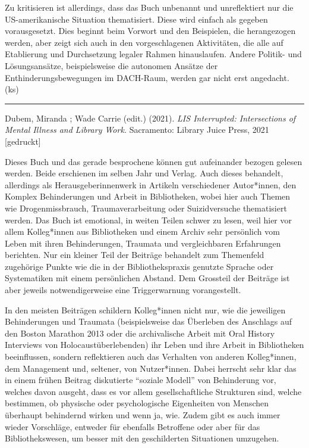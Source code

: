 \documentclass[a4paper,
fontsize=11pt,
oneside,
numbers=noperiodatend,
parskip=half-,
bibliography=totoc,
final
]{scrartcl}
\begin{document}
Zu kritisieren ist allerdings, dass das Buch unbenannt und unreflektiert
nur die US-amerikanische Situation thematisiert. Diese wird einfach als
gegeben vorausgesetzt. Dies beginnt beim Vorwort und den Beispielen, die
herangezogen werden, aber zeigt sich auch in den vorgeschlagenen
Aktivitäten, die alle auf Etablierung und Durchsetzung legaler Rahmen
hinauslaufen. Andere Politik- und Lösungsansätze, beispielsweise die
autonomen Ansätze der Enthinderungsbewegungen im DACH-Raum, werden gar
nicht erst angedacht. (ks)

\begin{center}\rule{0.5\linewidth}{0.5pt}\end{center}

Dubem, Miranda ; Wade Carrie (edit.) (2021). \emph{LIS Interrupted:
Intersections of Mental Illness and Library Work.} Sacramento: Library
Juice Press, 2021 {[}gedruckt{]}

Dieses Buch und das gerade besprochene können gut aufeinander bezogen
gelesen werden. Beide erschienen im selben Jahr und Verlag. Auch dieses
behandelt, allerdings als Herausgeberinnenwerk in Artikeln verschiedener
Autor*innen, den Komplex Behinderungen und Arbeit in Bibliotheken, wobei
hier auch Themen wie Drogenmissbrauch, Traumaverarbeitung oder
Suizidversuche thematisiert werden. Das Buch ist emotional, in weiten
Teilen schwer zu lesen, weil hier vor allem Kolleg*innen aus
Bibliotheken und einem Archiv sehr persönlich vom Leben mit ihren
Behinderungen, Traumata und vergleichbaren Erfahrungen berichten. Nur
ein kleiner Teil der Beiträge behandelt zum Themenfeld zugehörige Punkte
wie die in der Bibliothekspraxis genutzte Sprache oder Systematiken mit
einem persönlichen Abstand. Dem Grossteil der Beiträge ist aber jeweils
notwendigerweise eine Triggerwarnung vorangestellt.

In den meisten Beiträgen schildern Kolleg*innen nicht nur, wie die
jeweiligen Behinderungen und Traumata (beispielsweise das Überleben des
Anschlags auf den Boston Marathon 2013 oder die archivalische Arbeit mit
Oral History Interviews von Holocaustüberlebenden) ihr Leben und ihre
Arbeit in Bibliotheken beeinflussen, sondern reflektieren auch das
Verhalten von anderen Kolleg*innen, dem Management und, seltener, von
Nutzer*innen. Dabei herrscht sehr klar das in einem frühen Beitrag
diskutierte \enquote{soziale Modell} von Behinderung vor, welches davon
ausgeht, dass es vor allem gesellschaftliche Strukturen sind, welche
bestimmen, ob physische oder psychologische Eigenheiten von Menschen
überhaupt behindernd wirken und wenn ja, wie. Zudem gibt es auch immer
wieder Vorschläge, entweder für ebenfalls Betroffene oder aber für das
Bibliothekswesen, um besser mit den geschilderten Situationen umzugehen.
\end{document}
